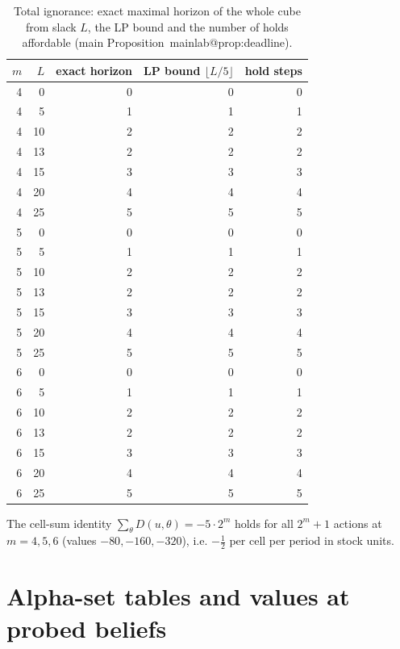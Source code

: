 \documentclass[11pt,a4paper]{article}
\makeatletter
\theoremstyle{plain}
\theoremstyle{definition}
\theoremstyle{remark}
\newcommand{\mref}[1]{\csname mainlab@#1\endcsname}
\makeatother
\begin{document}
\begin{table}[H]\centering\small
\caption{Total ignorance: exact maximal horizon of the whole cube from slack $L$, the LP bound and the number of holds affordable (main Proposition~\mref{prop:deadline}).}\label{tab:S5dl}
\begin{tabular}{rrrrr}
\toprule
$m$ & $L$ & exact horizon & LP bound $\lfloor L/5\rfloor$ & hold steps\\
\midrule
4 & 0 & 0 & 0 & 0\\
4 & 5 & 1 & 1 & 1\\
4 & 10 & 2 & 2 & 2\\
4 & 13 & 2 & 2 & 2\\
4 & 15 & 3 & 3 & 3\\
4 & 20 & 4 & 4 & 4\\
4 & 25 & 5 & 5 & 5\\
5 & 0 & 0 & 0 & 0\\
5 & 5 & 1 & 1 & 1\\
5 & 10 & 2 & 2 & 2\\
5 & 13 & 2 & 2 & 2\\
5 & 15 & 3 & 3 & 3\\
5 & 20 & 4 & 4 & 4\\
5 & 25 & 5 & 5 & 5\\
6 & 0 & 0 & 0 & 0\\
6 & 5 & 1 & 1 & 1\\
6 & 10 & 2 & 2 & 2\\
6 & 13 & 2 & 2 & 2\\
6 & 15 & 3 & 3 & 3\\
6 & 20 & 4 & 4 & 4\\
6 & 25 & 5 & 5 & 5\\
\bottomrule
\end{tabular}
\end{table}
The cell-sum identity $\sum_\theta D(u,\theta)=-5\cdot2^m$ holds for all $2^m+1$ actions at $m=4,5,6$ (values $-80,-160,-320$), i.e. $-\tfrac12$ per cell per period in stock units.
\section{Alpha-set tables and values at probed beliefs}\label{S:alpha}
\end{document}
